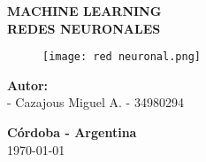 \begin{titlepage}
  \begin{center}
    \vspace*{0.4cm}
    \Huge\textbf {MACHINE LEARNING}\\
    \vspace*{0.3cm}
    \Large\textbf {REDES NEURONALES}\\
    \vspace*{0.3cm}
    \begin{figure}[H]
      \begin{center}
        \texttt{[image: red neuronal.png]}
      \end{center}
    \end{figure}
  \end{center}
  \begin{flushleft}
    \large\textbf {Autor:}\\
    \hspace{3cm}- Cazajous Miguel A. - 34980294\\
  \end{flushleft}
  \begin{center}
    \begin{large}
      \vspace*{0.5cm}
      \small\textbf {C\'ordoba - Argentina}\\
      \small\today
    \end{large}
  \end{center}
\end{titlepage}
